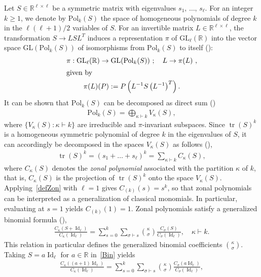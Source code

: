 \documentclass[10pt]{amsart}
\theoremstyle{definition}\newtheorem{defi}[theo]{Definition}\newtheorem{rema}[theo]{Remark}\newtheorem{exam}[theo]{Example}\newtheorem{exem}[theo]{Example}\newtheorem{nota}[theo]{Notation}
\DeclareMathOperator{\Id}{Id}
\DeclareMathOperator{\Tr}{tr}
\newcommand{\Pol}{\mathrm{Pol}}
\newcommand{\GL}{\mathrm{GL}}
\newcommand{\R}{\mathbb{R}}
\begin{document}
Let $S \in \R^{\ell \times \ell}$ be a symmetric matrix with eigenvalues $s_1,\,\ldots,\,s_{\ell}$. For an integer $k\geq 1$, we denote by $\Pol_{k}(S)$ the space of homogeneous polynomials of degree $k$ in the $\ell(\ell+1)/2$ variables of $S$. For an invertible matrix $L \in \R^{\ell \times \ell}$, the transformation $S \to LSL^T$ induces a representation $\pi$ of $\GL_{\ell}(\R)$ into the vector space $\GL(\Pol_{k}(S))$ of isomorphisms from $\Pol_{k}(S)$ to itself (\cite[Eq.~(A.2.1)]{Ch2012}):
\begin{gather*}
\pi : \GL_{\ell}(\R) \to
\GL(\Pol_{k}(S)) \ ; \quad L \to \pi(L) \ ,
\\
\intertext{given by}
\pi(L)(P):= P\left(L^{-1}S\left(L^{-1}\right)^T\right).
\end{gather*}
It can be shown that $\Pol_k(S)$ can be decomposed as direct sum (\cite[p.~297]{Ch2012})
\begin{gather}\label{Eq:Pol}
\Pol_k(S) = \bigoplus_{\kappa \vdash k} V_{\kappa}(S),
\end{gather}
where $\{V_{\kappa}(S): \kappa \vdash k\}$ are irreducible and $\pi$-invariant subspaces. Since $\Tr(S)^k$ is a homogeneous symmetric polynomial of degree $k$ in the eigenvalues of $S$, it can accordingly be decomposed in the spaces $V_{\kappa}(S)$ as follows (\cite[Eq.~(4.3.38)]{BFZP}),
\begin{gather}\label{defZon}
\Tr(S)^k = (s_1+\ldots+s_{\ell})^k = \sum_{\kappa \vdash k} C_{\kappa}(S),
\end{gather}
where $C_{\kappa}(S)$ denotes the \emph{zonal polynomial} associated with the partition $\kappa$ of $k$, that is, $C_{\kappa}(S)$ is the projection of $\Tr(S)^k $ onto the space $V_{\kappa}(S)$. Applying~\eqref{defZon} with $\ell=1$ gives $C_{(k)}(s)=s^k$, so that zonal polynomials can be interpreted as a generalization of classical monomials. In particular, evaluating at $s=1$ yields $C_{(k)}(1)=1$. Zonal polynomials satisfy a generalized binomial formula (\cite[Eq.~(4.5.1)]{BFZP}),
\begin{gather}\label{Bin}
\frac{C_{\kappa}(S+\Id_{\ell})}{C_{\kappa}(\Id_{\ell})} = \sum_{s=0}^{k} \sum_{\sigma \vdash s} \binom{\kappa}{\sigma} \frac{C_{\sigma}(S)}{C_{\sigma}(\Id_{\ell}) }, \quad \kappa \vdash k.
\end{gather}
This relation in particular defines the generalized binomial coefficients $\binom{\kappa}{\sigma}$. Taking $S=a\Id_{\ell}$ for $a \in \R$ in~\eqref{Bin} yields
\begin{gather*}
\frac{C_{\kappa}((a+1)\Id_{\ell})}{C_{\kappa}(\Id_{\ell})} =
\sum_{s=0}^{k}
\sum_{\sigma \vdash s} \binom{\kappa}{\sigma} \frac{C_{\sigma}(a \Id_{\ell})}{C_{\sigma}(\Id_{\ell}) },
\end{gather*}
\end{document}
